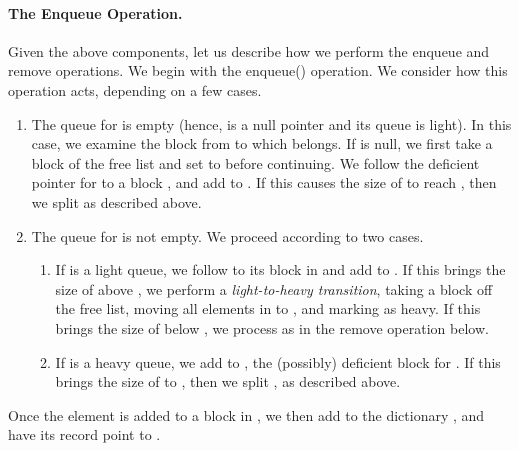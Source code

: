 \documentclass[11pt,letterpaper]{article}
\begin{document}
\paragraph{The Enqueue Operation.}
Given the above components,
let us describe how we 
perform the enqueue and remove operations.
We begin with the enqueue() operation.
We consider how this operation acts, depending on a few cases.

\begin{enumerate}
\item
The queue for  is empty (hence,  is a null pointer 
and its queue is light).
In this case, we examine the block  from  to which  belongs.
If  is null, we first take a block  of the free list and set  to  before continuing. 
We follow the deficient pointer for  to a block , and add  to . If this causes
the size of  to reach , then we split  as described above. 
\item
The queue  for  is not empty. We proceed according to two cases.
\begin{enumerate}
\item If  is a light queue, we follow  to its block  in  and add  to . If this
brings the size of  above , we perform a \emph{light-to-heavy transition}, taking a block  off the free list, moving all elements in 
to , and marking  as heavy. If this brings the size of  below , we process  as in the remove operation below.
\item If  is a heavy queue, we add  to , the (possibly) deficient block for .
If this brings the size of  to , then we split , as described
above.
\end{enumerate}
\end{enumerate}
Once the element  is added to a block  in , we then add
 to the dictionary , and have its record point to .
\end{document}
